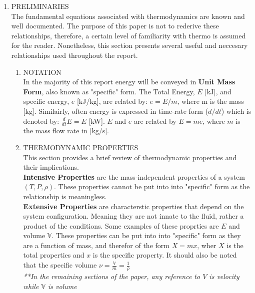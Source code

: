 \documentclass{article}
\begin{document}
\begin{enumerate}
    \item{PRELIMINARIES}\\
    The fundamental equations associated with thermodynamics are known and well documented. 
    The purpose of this paper is not to rederive these relationships, 
    therefore, a certain level of familiarity with thermo is assumed for the reader. 
    Nonetheless, this section presents several useful and neccesary relationships used throughout the report.
    \begin{enumerate}

        \item{NOTATION} \\ 
        In the majority of this report energy will be conveyed in {\bf Unit Mass Form}, also known as "specific" form. 
        The Total Energy, $E$ [kJ], and specific energy, $e$ [kJ/kg],  are related by: $e = E/m$, where m is the mass [kg]. 
        Similairly, often energy is expressed in time-rate form ($d/dt$) which is denoted by: $\frac{d}{dt}E = \dot{E}$ [kW].
        $\dot{E}$ and $e$ are related by $\dot{E}=\dot{m}e$, where $\dot{m}$ is the mass flow rate in [kg/s].

        \item{THERMODYNAMIC PROPERTIES} \\
        This section provides a brief review of thermodynamic properties and their implications.\\

        {\bf Intensive Properties} are the mass-independent properties of a system $(T,P,\rho)$. 
        These properties cannot be put into into "specific" form as the relationship is meaningless. \\

        {\bf Extensive Properties} are characterstic properties that depend on the system configuration.
        Meaning they are not innate to the fluid, rather a product of the conditions. 
        Some examples of these proprties are $E$ and volume $\mathbb{V}$. These properties can be put into into
         "specific" form as they are a function of mass, and therefor of the form
        $X = mx$, wher $X$ is the total properties and $x$ is the specific property. 
        It should also be noted that the specific volume $\nu = \frac{\mathbb{V}}{m} = \frac{1}{\rho}$\\

        \emph{**In the remaining sections of the paper, any reference to $V$ is velocity while $\mathbb{V}$ is volume}


\end{enumerate}
\end{enumerate}
\end{document}
